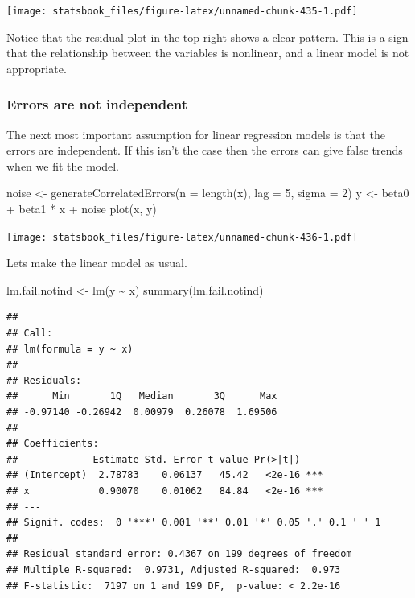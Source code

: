 \documentclass[
]{book}
\newenvironment{Shaded}{\begin{snugshade}}{\end{snugshade}}
\newcommand{\AttributeTok}[1]{\textcolor[rgb]{0.77,0.63,0.00}{#1}}
\newcommand{\DecValTok}[1]{\textcolor[rgb]{0.00,0.00,0.81}{#1}}
\newcommand{\FunctionTok}[1]{\textcolor[rgb]{0.00,0.00,0.00}{#1}}
\newcommand{\NormalTok}[1]{#1}
\newcommand{\OtherTok}[1]{\textcolor[rgb]{0.56,0.35,0.01}{#1}}
\newcommand{\SpecialCharTok}[1]{\textcolor[rgb]{0.00,0.00,0.00}{#1}}
\theoremstyle{definition}
\theoremstyle{definition}
\theoremstyle{definition}
\theoremstyle{definition}
\theoremstyle{remark}
\begin{document}
\texttt{[image: statsbook\_files/figure-latex/unnamed-chunk-435-1.pdf]}

Notice that the residual plot in the top right shows a clear pattern. This is a sign that the relationship between the variables is nonlinear, and a linear model is not appropriate.

\hypertarget{errors-are-not-independent}{%
\subsubsection{Errors are not independent}\label{errors-are-not-independent}}

The next most important assumption for linear regression models is that the errors are independent. If this isn't the case then the errors can give false trends when we fit the model.

\begin{Shaded}
\begin{Highlighting}[]
\NormalTok{noise }\OtherTok{\textless{}{-}} \FunctionTok{generateCorrelatedErrors}\NormalTok{(}\AttributeTok{n =} \FunctionTok{length}\NormalTok{(x), }\AttributeTok{lag =} \DecValTok{5}\NormalTok{, }\AttributeTok{sigma =} \DecValTok{2}\NormalTok{)}
\NormalTok{y }\OtherTok{\textless{}{-}}\NormalTok{ beta0 }\SpecialCharTok{+}\NormalTok{ beta1 }\SpecialCharTok{*}\NormalTok{ x }\SpecialCharTok{+}\NormalTok{ noise}
\FunctionTok{plot}\NormalTok{(x, y)}
\end{Highlighting}
\end{Shaded}

\texttt{[image: statsbook\_files/figure-latex/unnamed-chunk-436-1.pdf]}

Lets make the linear model as usual.

\begin{Shaded}
\begin{Highlighting}[]
\NormalTok{lm.fail.notind }\OtherTok{\textless{}{-}} \FunctionTok{lm}\NormalTok{(y }\SpecialCharTok{\textasciitilde{}}\NormalTok{ x)}
\FunctionTok{summary}\NormalTok{(lm.fail.notind)}
\end{Highlighting}
\end{Shaded}

\begin{verbatim}
## 
## Call:
## lm(formula = y ~ x)
## 
## Residuals:
##      Min       1Q   Median       3Q      Max 
## -0.97140 -0.26942  0.00979  0.26078  1.69506 
## 
## Coefficients:
##             Estimate Std. Error t value Pr(>|t|)    
## (Intercept)  2.78783    0.06137   45.42   <2e-16 ***
## x            0.90070    0.01062   84.84   <2e-16 ***
## ---
## Signif. codes:  0 '***' 0.001 '**' 0.01 '*' 0.05 '.' 0.1 ' ' 1
## 
## Residual standard error: 0.4367 on 199 degrees of freedom
## Multiple R-squared:  0.9731, Adjusted R-squared:  0.973 
## F-statistic:  7197 on 1 and 199 DF,  p-value: < 2.2e-16
\end{verbatim}
\end{document}
